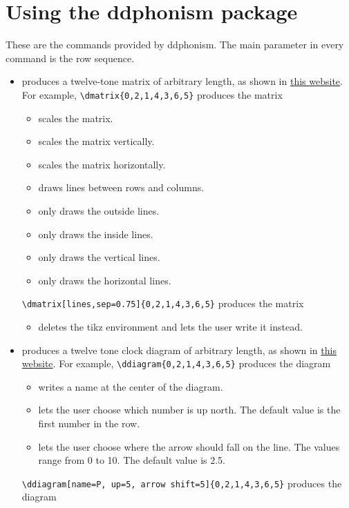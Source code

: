 \documentclass{article}
\begin{document}
	\section{Using the \textsf{ddphonism} package}
	These are the commands provided by \textsf{ddphonism}. The main parameter in every command is the row sequence.
	
	\newcommand{\I}[1]{\item[\texttt{$\backslash$#1}]\quad}	
	\newcommand{\Ii}[1]{\item[\textsf{#1}]\quad}
	\begin{itemize}
		\I{dmatrix} produces a twelve-tone matrix of arbitrary length, as shown in \href{https:matrices.netlify.com}{this website}. For example, \verb|| produces the matrix \dmatrix{0,2,1,4,3,6,5}

		\begin{itemize}
			\Ii{sep} scales the matrix.
			\Ii {vsep} scales the matrix vertically.
			\Ii {hsep} scales the matrix horizontally.
			\Ii{lines} draws lines between rows and columns.
			\Ii{outside lines} only draws the outside lines.
			\Ii{inside lines} only draws the inside lines.
			\Ii{vlines} only draws the vertical lines.
			\Ii{hlines} only draws the horizontal lines.
		\end{itemize}
		\verb|\dmatrix[lines,sep=0.75]{0,2,1,4,3,6,5}| produces the matrix
		
		
		\begin{itemize}
			\Ii{no tikz} deletes the tikz environment and lets the user write it instead.
		\end{itemize}
		
		\I{ddiagram} produces a twelve tone clock diagram of arbitrary length, as shown in \href{https:diagramas.netlify.com}{this website}. For example, \verb|\ddiagram{0,2,1,4,3,6,5}| produces the diagram\\ 
		
		\begin{itemize}
			\Ii{name} writes a name at the center of the diagram.
			\Ii{up} lets the user choose which number is up north. The default value is the first number in the row.
			\Ii{arrow shift} lets the user choose where the arrow should fall on the line. The values range from 0 to 10. The default value is 2.5.
		\end{itemize}
		
		\verb|\ddiagram[name=P, up=5, arrow shift=5]{0,2,1,4,3,6,5}| produces the diagram\\
		

\end{itemize}
\end{document}
